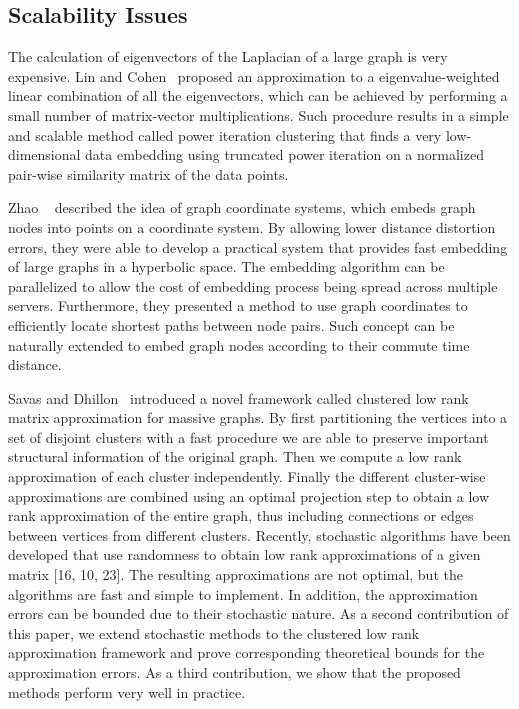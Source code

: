 \subsection{Scalability Issues}
The calculation of eigenvectors of the Laplacian of a large graph is very expensive. Lin and Cohen~\cite{LinEtal2010ICML} proposed an approximation to a eigenvalue-weighted linear combination of all the eigenvectors, which can be achieved by performing a small number of matrix-vector multiplications.  Such procedure results in a simple and scalable method called power iteration clustering that finds a very low-dimensional data embedding using truncated power iteration on a normalized pair-wise similarity matrix of the data points.

Zhao \etal~\cite{ZhaoEtal2011Eff} described the idea of graph coordinate systems, which embeds graph nodes into points on a coordinate system. By allowing lower distance distortion errors, they were able to develop a practical system that provides fast embedding of large graphs in a hyperbolic space. The embedding algorithm can be parallelized to allow the cost of embedding process being spread across multiple servers. Furthermore, they presented a method to use graph coordinates to efficiently locate shortest paths between node pairs. Such concept can be naturally extended to embed graph nodes according to their commute time distance.

Savas and Dhillon~\cite{SavasEtal2011Clu} introduced a novel framework called clustered low rank matrix approximation for massive graphs. By first partitioning the vertices into a set of disjoint clusters with a fast procedure we are able to preserve important structural information of the original graph. Then we compute a low rank approximation of each cluster independently. Finally the different cluster-wise approximations are combined using an optimal projection step to obtain a low rank approximation of the entire graph, thus including connections or edges between vertices from different clusters. Recently, stochastic algorithms have been developed that use randomness to obtain low rank approximations of a given matrix [16, 10, 23]. The resulting approximations are not optimal, but the algorithms are fast and simple to implement. In addition, the approximation errors can be bounded due to their stochastic nature. As a second contribution of this paper, we extend stochastic methods to the clustered low rank approximation framework and prove corresponding theoretical bounds for the approximation errors. As a third contribution, we show that the proposed methods perform very well in practice.

